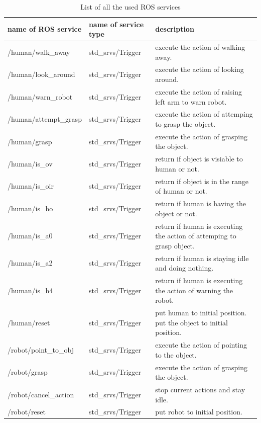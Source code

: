 \begin{table}[h]
 	\centering
 	\begin{tabular}{|p{4cm}|p{3cm}|p{4cm}|}
 		\hline
 		name of ROS service 	&	name of service type 	&	description			\\ \hline
 		/human/walk\_away		& 	std\_srvs/Trigger		&	execute the action of walking away.						\\ \hline
 		/human/look\_around		& 	std\_srvs/Trigger		&	execute the action of looking around.						\\ \hline
		/human/warn\_robot		&	std\_srvs/Trigger		&	execute the action of raising left arm to warn robot.		\\ \hline
		/human/attempt\_grasp	&	std\_srvs/Trigger		&   execute the action of attemping to grasp the object.		\\ \hline
		/human/grasp			&	std\_srvs/Trigger		&	execute the action of grasping the object.				\\ \hline
		/human/is\_ov			&	std\_srvs/Trigger		&	return if object is visiable to human or not.					\\ \hline
		/human/is\_oir			&	std\_srvs/Trigger		&	return if object is in the range of human or not.		\\ \hline
		/human/is\_ho			&	std\_srvs/Trigger		&	return if human is having the object or not.					\\ \hline
		/human/is\_a0			&	std\_srvs/Trigger		&	return if human is executing the action of attemping to grasp object.		\\ \hline
		/human/is\_a2			&	std\_srvs/Trigger		&	return if human is staying idle and doing nothing.				\\ \hline
		/human/is\_h4			&	std\_srvs/Trigger		&	return if human is executing the action of warning the robot.	\\ \hline
		/human/reset			&	std\_srvs/Trigger		&	put human to initial position. put the object to initial position.				\\ \hline
		/robot/point\_to\_obj	& 	std\_srvs/Trigger		&	execute the action of pointing to the object.				\\ \hline
 		/robot/grasp			& 	std\_srvs/Trigger		&	execute the action of grasping the object.				\\ \hline
		/robot/cancel\_action	&	std\_srvs/Trigger		&	stop current actions and stay idle.							\\ \hline
		/robot/reset			&	std\_srvs/Trigger		&	put robot to initial position.							\\ \hline
 	\end{tabular}
 	\caption{List of all the used ROS services}
 	\label{tbl:ROSservicelist}
\end{table}

